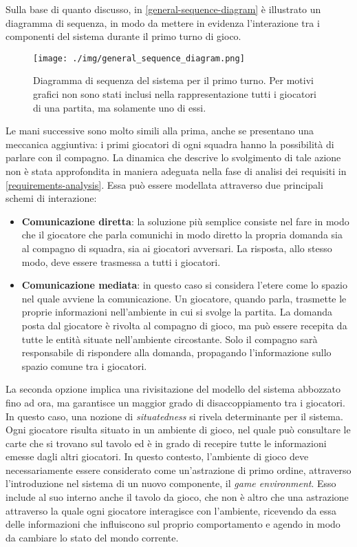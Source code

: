 \documentclass[a4paper,12pt]{article}
\begin{document}
Sulla base di quanto discusso, in \autoref{general-sequence-diagram} è illustrato un diagramma di sequenza, in modo da mettere in evidenza l'interazione tra i componenti del sistema durante il primo turno di gioco.


\begin{figure}[H]
	\hspace*{-0.7in}
	\centering
	\texttt{[image: ./img/general\_sequence\_diagram.png]}
	\caption{Diagramma di sequenza del sistema per il primo turno. Per motivi grafici non sono stati inclusi nella rappresentazione tutti i giocatori di una partita, ma solamente uno di essi. \label{general-sequence-diagram}}
\end{figure}

Le mani successive sono molto simili alla prima, anche se presentano una meccanica aggiuntiva: i primi giocatori di ogni squadra hanno la possibilità di parlare con il compagno. La dinamica che descrive lo svolgimento di tale azione non è stata approfondita in maniera adeguata nella fase di analisi dei requisiti in \autoref{requirements-analysis}. Essa può essere modellata attraverso due principali schemi di interazione:
\begin{itemize}
	\item \textbf{Comunicazione diretta}: la soluzione più semplice consiste nel fare in modo che il giocatore che parla comunichi in modo diretto la propria domanda sia al compagno di squadra, sia ai giocatori avversari. La risposta, allo stesso modo, deve essere trasmessa a tutti i giocatori.
	\item \textbf{Comunicazione mediata}: in questo caso si considera l'etere come lo spazio nel quale avviene la comunicazione. Un giocatore, quando parla, trasmette le proprie informazioni nell'ambiente in cui si svolge la partita. La domanda posta dal giocatore è rivolta al compagno di gioco, ma può essere recepita da tutte le entità situate nell'ambiente circostante. Solo il compagno sarà responsabile di rispondere alla domanda, propagando l'informazione sullo spazio comune tra i giocatori.
\end{itemize}
La seconda opzione implica una rivisitazione del modello del sistema abbozzato fino ad ora, ma garantisce un maggior grado di disaccoppiamento tra i giocatori. In questo caso, una nozione di \emph{situatedness} si rivela determinante per il sistema. Ogni giocatore risulta situato in un ambiente di gioco, nel quale può consultare le carte che si trovano sul tavolo ed è in grado di recepire tutte le informazioni emesse dagli altri giocatori. In questo contesto, l'ambiente di gioco deve necessariamente essere considerato come un'astrazione di primo ordine, attraverso l'introduzione nel sistema di un nuovo componente, il \emph{game environment}. Esso include al suo interno anche il tavolo da gioco, che non è altro che una astrazione attraverso la quale ogni giocatore interagisce con l'ambiente, ricevendo da essa delle informazioni che influiscono sul proprio comportamento e agendo in modo da cambiare lo stato del mondo corrente. 
\end{document}
